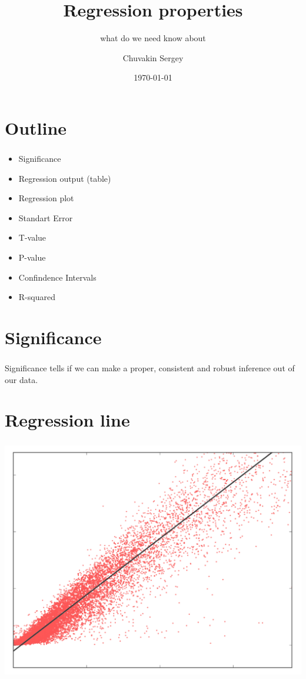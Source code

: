 \documentclass[t, 11pt]{beamer}
\title {Regression properties}
\subtitle{what do we need know about}
\author{Chuvakin Sergey}
\date{\today}
\institute[<<Anthropology and Sociology major>>]{<<School of Advanced Studies>>}
\begin{document}
	
	\frame[plain]{\titlepage}		
	
	\section{Outline}
	
		\begin{frame} 
			\frametitle{\insertsection} 
			\begin{itemize}
				\item Significance
				\item Regression output (table)
				\item Regression plot
				\item Standart Error
				\item T-value
				\item P-value
				\item Confindence Intervals 
				\item R-squared 
			\end{itemize}
\end{frame}

\section{Significance}

		\begin{frame} 
	\frametitle{\insertsection} 
	Significance tells if we can make a proper, consistent and robust inference out of our data. 
\end{frame}	

\section{Regression line}
\begin{frame} 
	\frametitle{\insertsection} 
	\begin{center}
		\includegraphics[scale=0.4]{reg_2d_line}
	\end{center}
\end{frame}	
\end{document}
